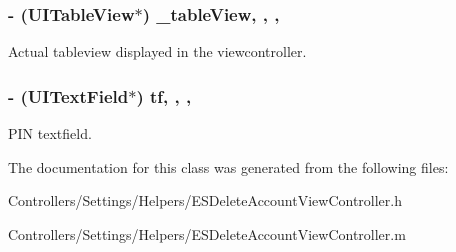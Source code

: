 \subsubsection[{\+\_\+table\+View}]{\setlength{\rightskip}{0pt plus 5cm}-\/ (U\+I\+Table\+View$\ast$) \+\_\+table\+View\hspace{0.3cm}{\ttfamily [read]}, {\ttfamily [write]}, {\ttfamily [nonatomic]}, {\ttfamily [strong]}}\label{interface_e_s_delete_account_view_controller_a79029845823c0fbc5b5eb8a98cf9b72b}
Actual tableview displayed in the viewcontroller. \hypertarget{interface_e_s_delete_account_view_controller_a087a1d468f6719f900cf77c5e4e58284}{}
\subsubsection[{tf}]{\setlength{\rightskip}{0pt plus 5cm}-\/ (U\+I\+Text\+Field$\ast$) tf\hspace{0.3cm}{\ttfamily [read]}, {\ttfamily [write]}, {\ttfamily [nonatomic]}, {\ttfamily [strong]}}\label{interface_e_s_delete_account_view_controller_a087a1d468f6719f900cf77c5e4e58284}
P\+I\+N textfield. 

The documentation for this class was generated from the following files\+:\begin{DoxyCompactItemize}
\item 
Controllers/\+Settings/\+Helpers/E\+S\+Delete\+Account\+View\+Controller.\+h\item 
Controllers/\+Settings/\+Helpers/E\+S\+Delete\+Account\+View\+Controller.\+m\end{DoxyCompactItemize}
